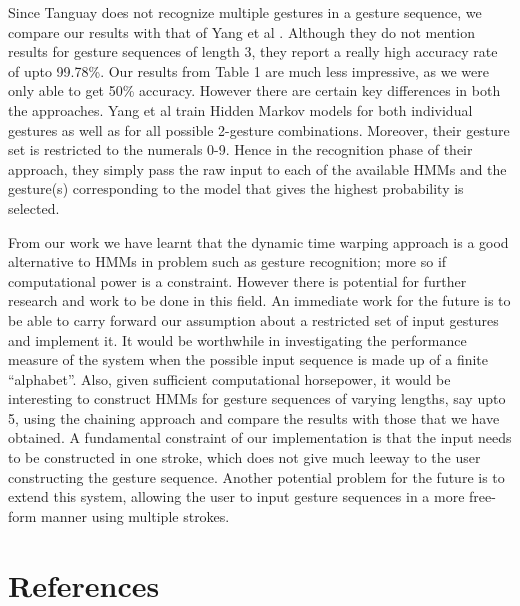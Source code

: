 \documentclass[twoside]{article}
\begin{document}
\begin{multicols}{2}
Since Tanguay does not recognize multiple gestures in a gesture sequence, we compare our results with that of Yang et al \cite{yang_gesture_1994}. Although they do not mention results for gesture sequences of length 3, they report a really high accuracy rate of upto 99.78\%. Our results from Table 1 are much less impressive, as we were only able to get 50\% accuracy. However there are certain key differences in both the approaches. Yang et al train Hidden Markov models for both individual gestures as well as for all possible 2-gesture combinations. Moreover, their gesture set is restricted to the numerals 0-9. Hence in the recognition phase of their approach, they simply pass the raw input to each of the available HMMs and the gesture(s) corresponding to the model that gives the highest probability is selected.

From our work we have learnt that the dynamic time warping approach is a good alternative to HMMs in problem such as gesture recognition; more so if computational power is a constraint. However there is potential for further research and work to be done in this field. An immediate work for the future is to be able to carry forward our assumption about a restricted set of input gestures and implement it. It would be worthwhile in investigating the performance measure of the system when the possible input sequence is made up of a finite ``alphabet''. Also, given sufficient computational horsepower, it would be interesting to construct HMMs for gesture sequences of varying lengths, say upto 5, using the chaining approach and compare the results with those that we have obtained. A fundamental constraint of our implementation is that the input needs to be constructed in one stroke, which does not give much leeway to the user constructing the gesture sequence. Another potential problem for the future is to extend this system, allowing the user to input gesture sequences in a more free-form manner using multiple strokes.

\section{References}

\begin{spacing}{0.9}
	
%
\begingroup
\renewcommand{\section}[2]{}%

\endgroup
\end{spacing}

\end{multicols}
\end{document}
